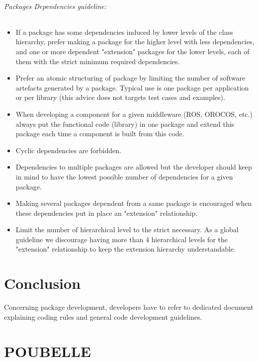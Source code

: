 \documentclass[12pt,a4paper]{article}
\begin{document}
\paragraph{Packages Dependencies guideline:}
\begin{itemize}
\item If a package has some dependencies induced by lower levels of the class hierarchy, prefer making a package for the higher level with less dependencies, and one or more dependent "extension" packages for the lower levels, each of them with the strict minimum required dependencies.
\item Prefer an atomic structuring of package by limiting the number of software artefacts generated by a package. Typical use is one package per application or per library (this advice does not targets test cases and examples).
\item When developing a component for a given middleware (ROS, OROCOS, etc.) always put the functional code (library) in one package and extend this package each time a component is built from this code.
\item Cyclic dependencies are forbidden.
\item Dependencies to multiple packages are allowed but the developer should keep in mind to have the lowest possible number of dependencies for a given package.
\item Making several packages dependent from a same package is encouraged when these dependencies put in place an "extension" relationship.
\item Limit the number of hierarchical level to the strict necessary. As a global guideline we discourage having more than 4 hierarchical levels for the "extension" relationship to keep the extension hierarchy understandable. 
\end{itemize}

\pagebreak

\part*{Conclusion}

Concerning package development, developers have to refer to dedicated document explaining coding rules and general code development guidelines.

\pagebreak

\part*{POUBELLE}
\end{document}

